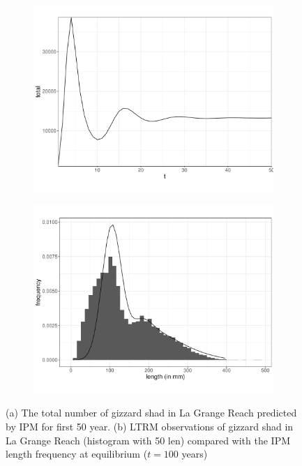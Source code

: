 \documentclass[preprint,review,12pt,authoryear]{elsarticle}
\begin{document}
\begin{figure}
\centering
\begin{subfigure}[b]{.43\textwidth}
  \includegraphics[width=\textwidth]{figures/ntotal.pdf}
   \caption{}
  \label{fig:ntotal}
\end{subfigure}
\begin{subfigure}[b]{.43\textwidth}
   \includegraphics[width=\textwidth]{figures/lagrange.pdf}
     \caption{}
\label{fig:lagrange}
\end{subfigure}
\caption{(a) The total number of gizzard shad in La Grange Reach predicted by IPM for first 50 year. (b) LTRM observations of gizzard shad in La Grange Reach (histogram with 50 len) compared with the IPM length frequency at equilibrium ($t=100$ years)}
\end{figure}    
\end{document}
